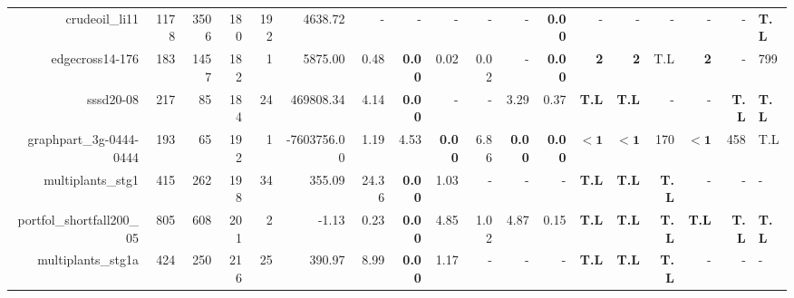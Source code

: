 \begin{table*}[t]
\begin{tabular}{|r|r|r|r|r||r||r|r|r|r|r||r|r|r|r|r|r|}
                    crudeoil\_li11 &         1178 &          3506 &          180 &           192 &             4638.72 &              - &              - &             - &              - &             - & \textbf{0.00} &                  - &                  - &                  - &                  - &            - & \textbf{T.L} \\ 
                   edgecross14-176 &          183 &          1457 &          182 &             1 &             5875.00 &           0.48 &  \textbf{0.00} &          0.02 &           0.02 &             - & \textbf{0.00} &         \textbf{2} &         \textbf{2} &                T.L &         \textbf{2} &            - &          799 \\ 
                         sssd20-08 &          217 &            85 &          184 &            24 &           469808.34 &           4.14 &  \textbf{0.00} &             - &              - &          3.29 &          0.37 &       \textbf{T.L} &       \textbf{T.L} &                  - &                  - & \textbf{T.L} & \textbf{T.L} \\ 
           graphpart\_3g-0444-0444 &          193 &            65 &          192 &             1 &         -7603756.00 &           1.19 &           4.53 & \textbf{0.00} &           6.86 & \textbf{0.00} & \textbf{0.00} &         $\bm{< 1}$ &         $\bm{< 1}$ &                170 &         $\bm{< 1}$ &          458 &          T.L \\ 
                 multiplants\_stg1 &          415 &           262 &          198 &            34 &              355.09 &          24.36 &  \textbf{0.00} &          1.03 &              - &             - &             - &       \textbf{T.L} &       \textbf{T.L} &       \textbf{T.L} &                  - &            - &            - \\ 
         portfol\_shortfall200\_05 &          805 &           608 &          201 &             2 &               -1.13 &           0.23 &  \textbf{0.00} &          4.85 &           1.02 &          4.87 &          0.15 &       \textbf{T.L} &       \textbf{T.L} &       \textbf{T.L} &       \textbf{T.L} & \textbf{T.L} & \textbf{T.L} \\ 
                multiplants\_stg1a &          424 &           250 &          216 &            25 &              390.97 &           8.99 &  \textbf{0.00} &          1.17 &              - &             - &             - &       \textbf{T.L} &       \textbf{T.L} &       \textbf{T.L} &                  - &            - &            - \\ 

\end{tabular}
\end{table*}
